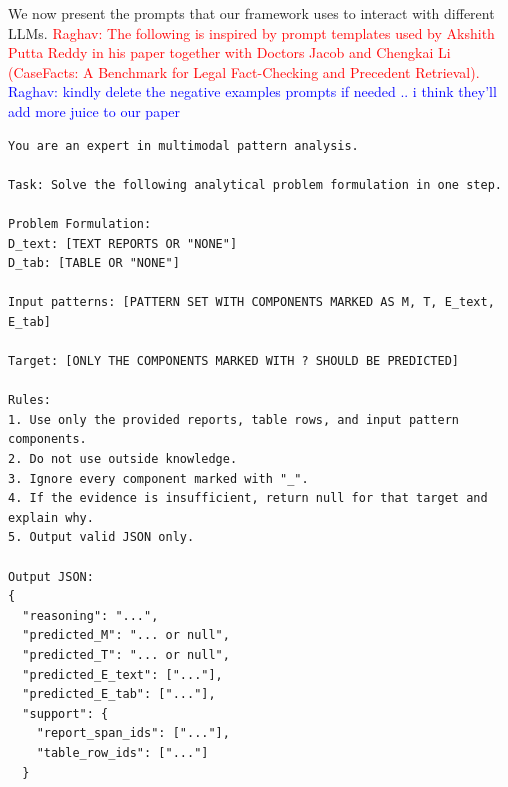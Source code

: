 \documentclass[sigconf,nonacm,anonymous]{acmart}
\begin{document}
We now present the prompts that our framework uses to interact with different LLMs. \textcolor{red}{Raghav: The following is inspired by prompt templates used by Akshith Putta Reddy in his paper together with Doctors Jacob and Chengkai Li (CaseFacts: A Benchmark for Legal Fact-Checking and Precedent Retrieval).} \textcolor{blue}{Raghav: kindly delete the negative examples prompts if needed .. i think they'll add more juice to our paper}

\begin{promptbox}\small
\begin{prompt}

\begin{verbatim}
You are an expert in multimodal pattern analysis.

Task: Solve the following analytical problem formulation in one step.

Problem Formulation:
D_text: [TEXT REPORTS OR "NONE"]
D_tab: [TABLE OR "NONE"]

Input patterns: [PATTERN SET WITH COMPONENTS MARKED AS M, T, E_text, E_tab]

Target: [ONLY THE COMPONENTS MARKED WITH ? SHOULD BE PREDICTED]

Rules:
1. Use only the provided reports, table rows, and input pattern components.
2. Do not use outside knowledge.
3. Ignore every component marked with "_".
4. If the evidence is insufficient, return null for that target and explain why.
5. Output valid JSON only.

Output JSON:
{
  "reasoning": "...",
  "predicted_M": "... or null",
  "predicted_T": "... or null",
  "predicted_E_text": ["..."],
  "predicted_E_tab": ["..."],
  "support": {
    "report_span_ids": ["..."],
    "table_row_ids": ["..."]
  }
\end{verbatim}
\end{prompt}
\end{promptbox}
\end{document}
